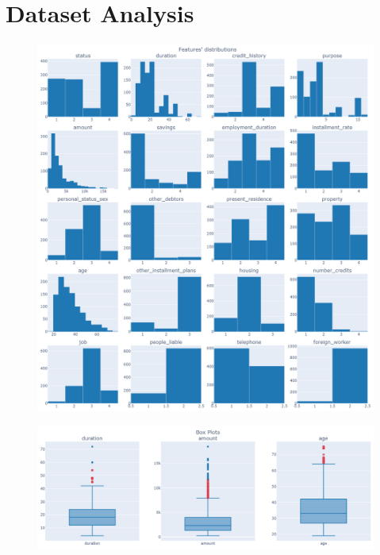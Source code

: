 \documentclass[letterpaper]{article}
\begin{document}
	\section{Dataset Analysis}
		\begin{figure}[h]
		\centering
		\includegraphics[width=.8\textwidth]{images/distributions.png}
		\label{fig:2}
	\end{figure}
	\begin{figure}[h]
		\centering
		\includegraphics[width=.85\textwidth]{images/significant_boxplots.png}
		\label{fig:3}
	\end{figure}
	
\end{document}

